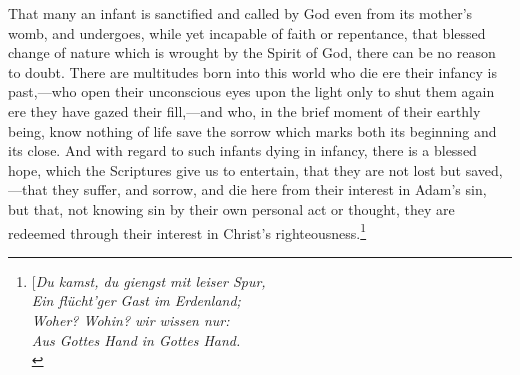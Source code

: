 \documentclass[
  english,
]{book}
\newcommand{\textgerman}[2][]{\foreignlanguage{ngerman}{#2}}
\begin{document}
That many an infant is sanctified and called by God even from its mother's womb, and undergoes, while yet incapable of faith or repentance, that blessed change of nature which is wrought by the Spirit of God, there can be no reason to doubt. There are multitudes born into this world who die ere their infancy is past,---who open their unconscious eyes upon the light only to shut them again ere they have gazed their fill,---and who, in the brief moment of their earthly being, know nothing of life save the sorrow which marks both its beginning and its close. And with regard to such infants dying in infancy, there is a blessed hope, which the Scriptures give us to entertain, that they are not lost but saved,---that they suffer, and sorrow, and die here from their interest in Adam's sin, but that, not knowing sin by their own personal act or thought, they are redeemed through their interest in Christ's righteousness.\footnote{{[}\textgerman{\emph{Du kamst, du giengst mit leiser Spur,\\
  \hspace*{0.333em}\hspace*{0.333em}\hspace*{0.333em}\hspace*{0.333em}Ein flücht'ger Gast im Erdenland;\\
  Woher? Wohin? wir wissen nur:\\
  \hspace*{0.333em}\hspace*{0.333em}\hspace*{0.333em}\hspace*{0.333em}Aus Gottes Hand in Gottes Hand.\\
}}}
\end{document}
